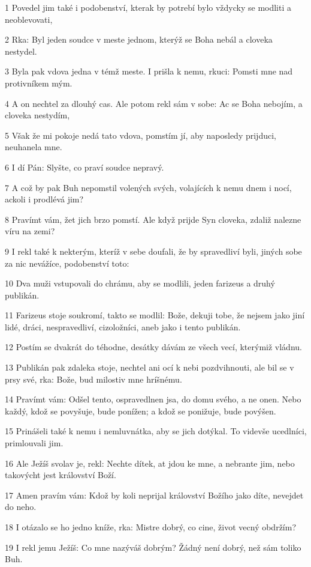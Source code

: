\par 1 Povedel jim také i podobenství, kterak by potrebí bylo vždycky se modliti a neoblevovati,
\par 2 Rka: Byl jeden soudce v meste jednom, kterýž se Boha nebál a cloveka nestydel.
\par 3 Byla pak vdova jedna v témž meste. I prišla k nemu, rkuci: Pomsti mne nad protivníkem mým.
\par 4 A on nechtel za dlouhý cas. Ale potom rekl sám v sobe: Ac se Boha nebojím, a cloveka nestydím,
\par 5 Však že mi pokoje nedá tato vdova, pomstím jí, aby naposledy prijduci, neuhanela mne.
\par 6 I dí Pán: Slyšte, co praví soudce nepravý.
\par 7 A což by pak Buh nepomstil volených svých, volajících k nemu dnem i nocí, ackoli i prodlévá jim?
\par 8 Pravímt vám, žet jich brzo pomstí. Ale když prijde Syn cloveka, zdaliž nalezne víru na zemi?
\par 9 I rekl také k nekterým, kteríž v sebe doufali, že by spravedliví byli, jiných sobe za nic nevážíce, podobenství toto:
\par 10 Dva muži vstupovali do chrámu, aby se modlili, jeden farizeus a druhý publikán.
\par 11 Farizeus stoje soukromí, takto se modlil: Bože, dekuji tobe, že nejsem jako jiní lidé, dráci, nespravedliví, cizoložníci, aneb jako i tento publikán.
\par 12 Postím se dvakrát do téhodne, desátky dávám ze všech vecí, kterýmiž vládnu.
\par 13 Publikán pak zdaleka stoje, nechtel ani ocí k nebi pozdvihnouti, ale bil se v prsy své, rka: Bože, bud milostiv mne hríšnému.
\par 14 Pravímt vám: Odšel tento, ospravedlnen jsa, do domu svého, a ne onen. Nebo každý, kdož se povyšuje, bude ponížen; a kdož se ponižuje, bude povýšen.
\par 15 Prinášeli také k nemu i nemluvnátka, aby se jich dotýkal. To videvše ucedlníci, primlouvali jim.
\par 16 Ale Ježíš svolav je, rekl: Nechte dítek, at jdou ke mne, a nebrante jim, nebo takovýcht jest království Boží.
\par 17 Amen pravím vám: Kdož by koli neprijal království Božího jako díte, nevejdet do neho.
\par 18 I otázalo se ho jedno kníže, rka: Mistre dobrý, co cine, život vecný obdržím?
\par 19 I rekl jemu Ježíš: Co mne nazýváš dobrým? Žádný není dobrý, než sám toliko Buh.
